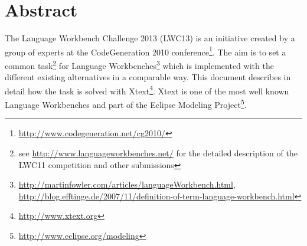\section*{Abstract}
The Language Workbench Challenge 2013 (LWC13) is an initiative created by a
group of experts at the CodeGeneration 2010
conference\footnote{\url{http://www.codegeneration.net/cg2010/}}. The aim is to
set a common task\footnote{see \url{http://www.languageworkbenches.net/} for the
detailed description of the LWC11 competition and other submissions}
for Language Workbenches\footnote{\url{http://martinfowler.com/articles/languageWorkbench.html},
\url{http://blog.efftinge.de/2007/11/definition-of-term-language-workbench.html}}
which is implemented with the different existing alternatives in a comparable
way. This document describes in detail how the task is solved with
Xtext\footnote{\url{http://www.xtext.org}}. Xtext is one of the most well known
Language Workbenches and part of the Eclipse Modeling
Project\footnote{\url{http://www.eclipse.org/modeling}}.

